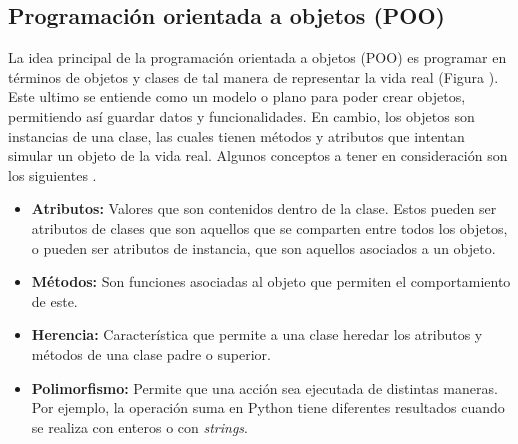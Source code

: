 \subsection{Programación orientada a objetos (POO)}

La idea principal de la programación orientada a objetos (POO) es programar en términos de objetos y clases de tal manera de representar la vida real (Figura ). Este ultimo se entiende como un modelo o plano para poder crear objetos, permitiendo así guardar datos y funcionalidades. En cambio, los objetos son instancias de una clase, las cuales tienen métodos y atributos que intentan simular un objeto de la vida real. Algunos conceptos a tener en consideración son los siguientes \citep{tatachar2021object}. 

\begin{itemize}
    \item \textbf{Atributos:} Valores que son contenidos dentro de la clase. Estos pueden ser atributos de clases que son aquellos que se comparten entre todos los objetos, o pueden ser atributos de instancia, que son aquellos asociados a un objeto. 
    \item \textbf{Métodos:} Son funciones asociadas al objeto que permiten el comportamiento de este.
    \item \textbf{Herencia:} Característica que permite a una clase heredar los atributos y métodos de una clase padre o superior. 
    \item \textbf{Polimorfismo:} Permite que una acción sea ejecutada de distintas maneras. Por ejemplo, la operación suma en Python tiene diferentes resultados cuando se realiza con enteros o con \textit{strings}.
\end{itemize}

